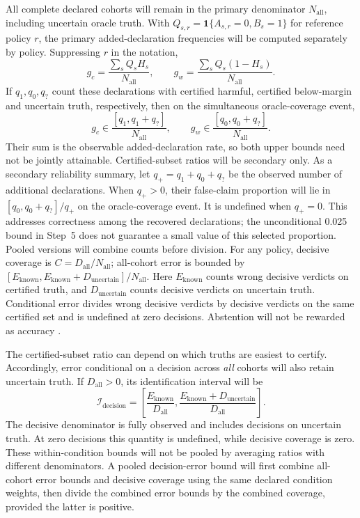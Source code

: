 \documentclass[11pt,a4paper]{article}
\newcommand{\ind}{\mathbf{1}}
\begin{document}
All complete declared cohorts will remain in the primary denominator
$N_{\mathrm{all}}$, including uncertain oracle truth. With
$Q_{s,r}=\ind\{A_{s,r}=0,B_s=1\}$ for reference policy $r$, the primary
added-declaration frequencies will be computed separately by policy. Suppressing
$r$ in the notation,
\begin{equation}
g_c=\frac{\sum_s Q_sH_s}{N_{\mathrm{all}}},\qquad
g_w=\frac{\sum_s Q_s(1-H_s)}{N_{\mathrm{all}}}.
\end{equation}
If $q_1,q_0,q_?$ count these declarations with certified harmful,
certified below-margin and uncertain truth, respectively, then on the
simultaneous oracle-coverage event,
\begin{equation}
g_c\in\frac{[q_1,q_1+q_?]}{N_{\mathrm{all}}},\qquad
g_w\in\frac{[q_0,q_0+q_?]}{N_{\mathrm{all}}}.
\end{equation}
Their sum is the observable added-declaration rate, so both upper bounds need
not be jointly attainable. Certified-subset ratios will be secondary only.
As a secondary reliability summary, let $q_+=q_1+q_0+q_?$ be the observed
number of additional declarations. When $q_+>0$, their false-claim proportion
will lie in $[q_0,q_0+q_?]/q_+$ on the oracle-coverage event. It is undefined
when $q_+=0$. This addresses correctness among the recovered declarations;
the unconditional 0.025 bound in Step~5 does not guarantee a small value of
this selected proportion. Pooled versions will combine counts before division.
For any policy, decisive coverage is $C=D_{\mathrm{all}}/N_{\mathrm{all}}$;
all-cohort error is bounded by
$[E_{\mathrm{known}},E_{\mathrm{known}}+D_{\mathrm{uncertain}}]/N_{\mathrm{all}}$.
Here $E_{\mathrm{known}}$ counts wrong decisive verdicts on certified truth,
and $D_{\mathrm{uncertain}}$ counts decisive verdicts on uncertain truth.
Conditional error divides wrong decisive verdicts by decisive verdicts on the
same certified set and is undefined at zero decisions. Abstention will not
be rewarded as accuracy \cite{hoeffding,selective}.

The certified-subset ratio can depend on which truths are easiest to certify.
Accordingly, error conditional on a decision across \emph{all} cohorts will
also retain uncertain truth. If $D_{\mathrm{all}}>0$, its identification
interval will be
\begin{equation}
\mathcal I_{\mathrm{decision}}=
\left[\frac{E_{\mathrm{known}}}{D_{\mathrm{all}}},
\frac{E_{\mathrm{known}}+D_{\mathrm{uncertain}}}{D_{\mathrm{all}}}\right].
\end{equation}
The decisive denominator is fully observed and includes decisions on uncertain
truth. At zero decisions this quantity is undefined, while decisive coverage
is zero. These within-condition bounds will not be pooled by averaging ratios
with different denominators. A pooled decision-error bound will first combine
all-cohort error bounds and decisive coverage using the same declared
condition weights, then divide the combined error bounds by the combined
coverage, provided the latter is positive.
\end{document}
